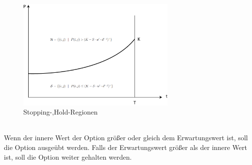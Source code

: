 \documentclass[12pt,a4paper]{article}
\begin{document}
\begin{text}
\begin{figure}[h]
\begin{center}
 \includegraphics[width=0.7\textwidth]{BoundaryBild.png}
 \caption{Stopping-,Hold-Regionen}
\end{center}
\end{figure}
\\
\raggedlift Wenn der innere Wert der Option größer oder gleich dem Erwartungswert ist, soll die Option ausgeübt werden. Falls der Erwartungswert größer als der innere Wert ist, soll die Option weiter gehalten werden.




\end{text}
\end{document}
